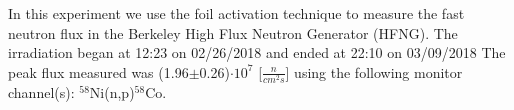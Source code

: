 In this experiment we use the foil activation technique to measure the fast neutron flux in the Berkeley High Flux Neutron Generator (HFNG).  The irradiation began at 12:23 on 02/26/2018 and ended at 22:10 on 03/09/2018  The peak flux measured was (1.96$\pm$0.26)$\cdot 10^7$ [$\frac{n}{cm^2s}$] using the following monitor channel(s): $^{58}$Ni(n,p)$^{58}$Co.